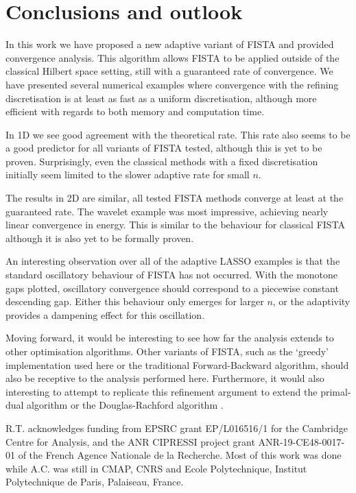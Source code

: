 \documentclass[smallextended]{svjour3}
\newcommand{\1}{\F{1}}
\begin{document}
	\section{Conclusions and outlook}
	In this work we have proposed a new adaptive variant of FISTA and provided convergence analysis. This algorithm allows FISTA to be applied outside of the classical Hilbert space setting, still with a guaranteed rate of convergence. We have presented several numerical examples where convergence with the refining discretisation is at least as fast as a uniform discretisation, although more efficient with regards to both memory and computation time. 
	
	In 1D we see good agreement with the theoretical rate. This rate also seems to be a good predictor for all variants of FISTA tested, although this is yet to be proven. Surprisingly, even the classical methods with a fixed discretisation initially seem limited to the slower adaptive rate for small $n$.
	
	The results in 2D are similar, all tested FISTA methods converge at least at the guaranteed rate. The wavelet example was most impressive, achieving nearly linear convergence in energy. This is similar to the behaviour for classical FISTA although it is also yet to be formally proven.
	
	An interesting observation over all of the adaptive LASSO examples is that the standard oscillatory behaviour of FISTA has not occurred. With the monotone gaps plotted, oscillatory convergence should correspond to a piecewise constant descending gap. Either this behaviour only emerges for larger $n$, or the adaptivity provides a dampening effect for this oscillation.
	
	Moving forward, it would be interesting to see how far the analysis extends to other optimisation algorithms. Other variants of FISTA, such as the `greedy' implementation used here or the traditional Forward-Backward algorithm, should also be receptive to the analysis performed here. Furthermore, it would also interesting to attempt to replicate this refinement argument to extend the primal-dual algorithm \cite{Chambolle2011} or the Douglas-Rachford algorithm \cite{Douglas1956}.
	
	\begin{acknowledgements}
		R.T. acknowledges funding from EPSRC grant EP/L016516/1 for the Cambridge Centre for Analysis, and the ANR CIPRESSI project grant ANR-19-CE48-0017-01 of the French Agence Nationale de la Recherche. Most of this work was done while A.C. was still in CMAP, CNRS and Ecole Polytechnique, Institut Polytechnique de Paris, Palaiseau, France.
	\end{acknowledgements}
	\begingroup
	
	\endgroup
	\appendix
\end{document}
